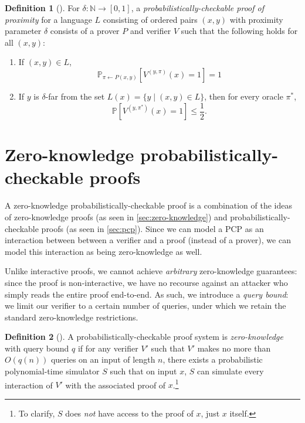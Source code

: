 \documentclass[english,12pt]{reedthesis}
\theoremstyle{plain}
\theoremstyle{definition}
\newtheorem{defn}[defn]{Definition}
\theoremstyle{remark}
\begin{document}
\begin{defn}[{\cite[Def.\ 2.2]{GOS25}}]\label{def:pcpp}
  For $\delta: \mathbb{N} \rightarrow [0, 1]$, a \emph{probabilistically-checkable proof of proximity}
  for a language $L$ consisting of ordered pairs $(x, y)$ with proximity
  parameter $\delta$ consists of a prover $P$ and verifier $V$ such that the
  following holds for all $(x, y)$:
  \begin{enumerate}
    \item If $(x, y) \in L$,
          \[
            \mathbb{P}_{\pi \leftarrow P(x, y)}[V^{(y, \pi)}(x) = 1] = 1
          \]
    \item If $y$ is $\delta$-far from the set $L(x) = \{y \mid (x, y) \in L\}$, then for
          every oracle $\pi^{*}$,
          \[
            \mathbb{P}[V^{(y, \pi^{*})}(x) = 1] \le \frac{1}{2}.
          \]
  \end{enumerate}
\end{defn}

\section{Zero-knowledge probabilistically-checkable proofs}\label{sec:pzkpcp}

A zero-knowledge probabilistically-checkable proof is a combination of the ideas
of zero-knowledge proofs (as seen in \cref{sec:zero-knowledge}) and
probabilistically-checkable proofs (as seen in \cref{sec:pcp}). Since we can
model a PCP as an interaction between between a verifier and a proof (instead of
a prover), we can model this interaction as being zero-knowledge as well.

Unlike interactive proofs, we cannot achieve \emph{arbitrary} zero-knowledge
guarantees: since the proof is non-interactive, we have no recourse against an
attacker who simply reads the entire proof end-to-end. As such, we introduce a
\emph{query bound}: we limit our verifier to a certain number
of queries, under which we retain the standard zero-knowledge restrictions.

\begin{defn}[{\cite[Def.\ 8.6]{GOS24}}]\label{def:pzkpcp}
  A probabilistically-checkable proof system is \emph{zero-knowledge} with query
  bound $q$ if for any verifier $V'$ such that $V'$ makes no more than $O(q(n))$
  queries on an input of length $n$, there exists a probabilistic
  polynomial-time simulator $S$ such that on input $x$, $S$ can simulate every
  interaction of $V'$ with the associated proof of $x$.\footnote{To clarify, $S$
    does \emph{not} have access to the proof of $x$, just $x$ itself.}
\end{defn}
\end{document}
